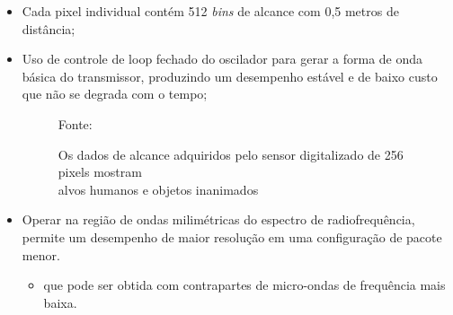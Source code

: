 \documentclass[xcolor=dvipsnames, aspectratio=169]{beamer}
\begin{document}
\begin{frame}
\begin{itemize}
        \item Cada pixel individual contém 512 \textit{bins} de alcance com 0,5 metros de distância;
        \item Uso de controle de loop fechado do oscilador para gerar a forma de onda básica do transmissor, produzindo um desempenho estável e de baixo custo que não se degrada com o tempo;
        \newpage
        \begin{figure}
            \centering
            {Fonte: \cite{everett1995sensors}}
            \caption{Os dados de alcance adquiridos pelo sensor digitalizado de 256 pixels mostram \\ alvos humanos e objetos inanimados}
            \label{fig:militech_sensor_data}
        \end{figure}


        \item Operar na região de ondas milimétricas do espectro de radiofrequência, permite um desempenho de maior resolução em uma configuração de pacote menor.
        \begin{itemize}
            \item que pode ser obtida com contrapartes de micro-ondas de frequência mais baixa.
        \end{itemize}
        

\end{itemize}
\end{frame}
\end{document}
